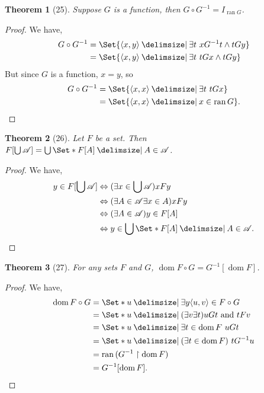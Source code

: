 \documentclass[12pt]{article}
\theoremstyle{plain}
\newtheorem*{exthm}{Theorem}
\theoremstyle{remark}
\theoremstyle{definition}
\theoremstyle{remark}
\providecommand\st{}
\newcommand\SetSymbol[1][]{%
  \nonscript\:#1\vert%
  \allowbreak%
  \nonscript\:
\mathopen{}}
\DeclarePairedDelimiter{\ang}{\langle}{\rangle}
\renewcommand\st{\SetSymbol[\delimsize]}
\renewcommand{\iff}{\Leftrightarrow}
\DeclareMathOperator{\dom}{dom}
\DeclareMathOperator{\ran}{ran}
\begin{document}
\begin{exthm}[25]
  Suppose $G$ is a function, then $G \circ G^{-1} = I_{\ran{G}}$.
\end{exthm}

\begin{proof}
  We have,
  \begin{align*}
    G \circ G^{-1} &= \Set{\ang{x,y} \st \exists t\ x G^{-1} t \land tGy}\\
                   &= \Set{\ang{x,y} \st \exists t\ tGx \land tGy}
  \end{align*}
  But since $G$ is a function, $x = y$, so
  \begin{align*}
    G \circ G^{-1} &= \Set{\ang{x,x} \st \exists t\ tGx}\\
                   &= \Set{\ang{x,x} \st x \in \ran{G}}.
  \end{align*}
\end{proof}

\begin{exthm}[26]
  Let $F$ be a set. Then $F[\bigcup \mathscr{A}] = \bigcup \Set*{F[A] \st A \in \mathscr{A}}$.
\end{exthm}

\begin{proof}
  We have,
  \begin{align*}
    y \in F[\bigcup \mathscr{A}] &\iff (\exists x \in \bigcup \mathscr{A}) xFy\\
                                 &\iff (\exists A \in \mathscr{A} \exists x \in A) xFy\\
                                 &\iff (\exists A \in \mathscr{A}) y \in F[A]\\
                                 &\iff y \in \bigcup \Set*{F[A] \st A \in \mathscr{A}}.
  \end{align*}
\end{proof}

\begin{exthm}[27]
  For any sets $F$ and $G$, $\dom{F \circ G} = G^{-1}[\dom{F}]$.
\end{exthm}
\begin{proof}
  We have,
  \begin{align*}
    \dom{F \circ G} &= \Set*{u \st \exists y \ang{u, v} \in F \circ G}\\
                    &= \Set*{u \st (\exists v \exists t) uGt \text{ and } tFv}\\
                    &= \Set*{u \st \exists t \in \dom{F}\ uGt}\\
                    &= \Set*{u \st (\exists t \in \dom{F})\ tG^{-1}u}\\
                    &= \ran{(G^{-1} \restriction \dom F)}\\
                    &= G^{-1}[\dom{F}].
  \end{align*}
\end{proof}
\end{document}
